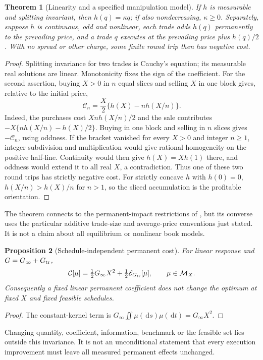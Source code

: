 \documentclass[11pt]{article}
\numberwithin{equation}{section}
\newtheorem{theorem}{Theorem}[section]
\newtheorem{proposition}[theorem]{Proposition}
\theoremstyle{definition}
\theoremstyle{remark}
\theoremstyle{definition}
\newcommand{\dd}{\,\mathrm d}
\begin{document}
\begin{theorem}[Linearity and a specified manipulation model]\label{thm:cauchy}
If $h$ is measurable and splitting invariant, then $h(q)=\kappa q$; if also
nondecreasing, $\kappa\geq0$. Separately, suppose $h$ is continuous, odd and
nonlinear, each trade adds $h(q)$ permanently to the prevailing price, and a
trade $q$ executes at the prevailing price plus $h(q)/2$. With no spread or
other charge, some finite round trip then has negative cost.
\end{theorem}
\begin{proof}
Splitting invariance for two trades is Cauchy's equation; its measurable real
solutions are linear. Monotonicity fixes the sign of the coefficient.
For the second assertion, buying $X>0$ in $n$ equal slices and selling $X$ in
one block gives, relative to the initial price,
\begin{equation}\label{eq:roundtrip}
 \mathcal C_n=\frac X2\{h(X)-nh(X/n)\}.
\end{equation}
Indeed, the purchases cost $Xnh(X/n)/2$ and the sale contributes
$-X\{nh(X/n)-h(X)/2\}$. Buying in one block and selling in $n$ slices gives
$-\mathcal C_n$, using oddness. If the bracket vanished for every $X>0$ and
integer $n\geq1$, integer subdivision and multiplication would give rational
homogeneity on the positive half-line. Continuity would then give
$h(X)=Xh(1)$ there, and oddness would extend it to all real $X$, a
contradiction. Thus one of these two round trips has strictly negative cost.
For strictly concave $h$ with $h(0)=0$, $h(X/n)>h(X)/n$ for $n>1$,
so the sliced accumulation is the profitable orientation.
\end{proof}

The theorem connects to the permanent-impact restrictions of
\citet{hubermanstanzl2004}, but its converse uses the particular additive
trade-size and average-price conventions just stated. It is not a claim about
all equilibrium or nonlinear book models.

\begin{proposition}[Schedule-independent permanent cost]\label{prop:perminvisible}
For linear response and $G=G_\infty+G_{\rm tr}$,
\[
 \mathcal C[\mu]=\tfrac12G_\infty X^2+
                    \tfrac12\mathcal E_{G_{\rm tr}}[\mu],\qquad \mu\in\mathcal M_X.
\]
Consequently a fixed linear permanent coefficient does not change the optimum
at fixed $X$ and fixed feasible schedules.
\end{proposition}
\begin{proof}
The constant-kernel term is
$G_\infty\iint\mu(\dd s)\mu(\dd t)=G_\infty X^2$.
\end{proof}
Changing quantity, coefficient, information, benchmark or the feasible set lies
outside this invariance. It is not an unconditional statement that every
execution improvement must leave all measured permanent effects unchanged.
\end{document}
